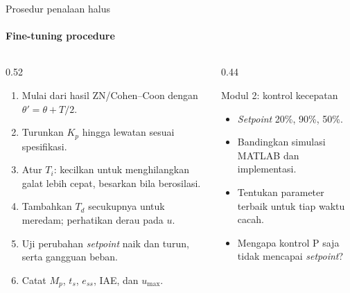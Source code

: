 \documentclass[aspectratio=169,10pt]{beamer}
\begin{document}
\begin{frame}{Prosedur penalaan halus}
	\framesubtitle{Fine-tuning procedure}
	\begin{columns}[T]
		\begin{column}{0.52\textwidth}
			\begin{enumerate}
				\item Mulai dari hasil ZN/Cohen--Coon dengan $\theta' = \theta + T/2$.
				\item Turunkan $K_p$ hingga lewatan sesuai spesifikasi.
				\item Atur $T_i$: kecilkan untuk menghilangkan galat lebih cepat, besarkan bila berosilasi.
				\item Tambahkan $T_d$ secukupnya untuk meredam; perhatikan derau pada $u$.
				\item Uji perubahan \textit{setpoint} naik dan turun, serta gangguan beban.
				\item Catat $M_p$, $t_s$, $e_{ss}$, IAE, dan $u_{\max}$.
			\end{enumerate}
		\end{column}
		\begin{column}{0.44\textwidth}
			\begin{block}{Modul 2: kontrol kecepatan}
				\small
				\begin{itemize}
					\item \textit{Setpoint} 20\%, 90\%, 50\%.
					\item Bandingkan simulasi MATLAB dan implementasi.
					\item Tentukan parameter terbaik untuk tiap waktu cacah.
					\item Mengapa kontrol P saja tidak mencapai \textit{setpoint}?
				\end{itemize}
			\end{block}
		\end{column}
	\end{columns}
\end{frame}
\end{document}
